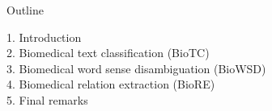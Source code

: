 \begin{frame}[t]{Outline}


\vspace*{5mm}

1. Introduction\\[12pt]
2. Biomedical text classification (BioTC)\\[12pt]
3. Biomedical word sense disambiguation (BioWSD)\\[12pt]
4. Biomedical relation extraction (BioRE)\\[12pt]
5. Final remarks

\end{frame}
